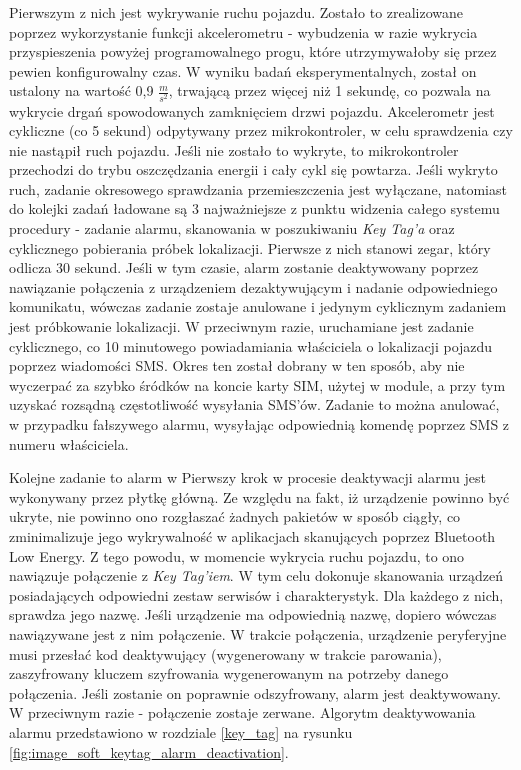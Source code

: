 Pierwszym z nich jest wykrywanie ruchu pojazdu. Zostało to zrealizowane poprzez wykorzystanie funkcji akcelerometru - wybudzenia w razie wykrycia przyspieszenia powyżej programowalnego progu, które utrzymywałoby się przez pewien konfigurowalny czas. W wyniku badań eksperymentalnych, został on ustalony na wartość 0,9 $\frac{m}{s^2}$, trwającą przez więcej niż 1 sekundę, co pozwala na wykrycie drgań spowodowanych zamknięciem drzwi pojazdu. Akcelerometr jest cykliczne (co 5 sekund) odpytywany przez mikrokontroler, w celu sprawdzenia czy nie nastąpił ruch pojazdu. Jeśli nie zostało to wykryte, to mikrokontroler przechodzi do trybu oszczędzania energii i cały cykl się powtarza. Jeśli wykryto ruch, zadanie okresowego sprawdzania przemieszczenia jest wyłączane, natomiast do kolejki zadań ładowane są 3 najważniejsze z punktu widzenia całego systemu procedury - zadanie alarmu, skanowania w poszukiwaniu \textit{Key Tag'a} oraz cyklicznego pobierania próbek lokalizacji. Pierwsze z nich stanowi zegar, który odlicza 30 sekund. Jeśli w tym czasie, alarm zostanie deaktywowany poprzez nawiązanie połączenia z urządzeniem dezaktywującym i nadanie odpowiedniego komunikatu, wówczas zadanie zostaje anulowane i jedynym cyklicznym zadaniem jest próbkowanie lokalizacji. W przeciwnym razie, uruchamiane jest zadanie cyklicznego, co 10 minutowego powiadamiania właściciela o lokalizacji pojazdu poprzez wiadomości SMS. Okres ten został dobrany w ten sposób, aby nie wyczerpać za szybko śródków na koncie karty SIM, użytej w module, a przy tym uzyskać rozsądną częstotliwość wysyłania SMS'ów. Zadanie to można anulować, w przypadku fałszywego alarmu, wysyłając odpowiednią komendę poprzez SMS z numeru właściciela. 

Kolejne zadanie to alarm w Pierwszy krok w procesie deaktywacji alarmu jest wykonywany przez płytkę główną. Ze względu na fakt, iż urządzenie powinno być ukryte, nie powinno ono rozgłaszać żadnych pakietów w sposób ciągły, co zminimalizuje jego wykrywalność w aplikacjach skanujących poprzez Bluetooth Low Energy. Z tego powodu, w momencie wykrycia ruchu pojazdu, to ono nawiązuje połączenie z \textit{Key Tag'iem}. W tym celu dokonuje skanowania urządzeń posiadających odpowiedni zestaw serwisów i charakterystyk. Dla każdego z nich, sprawdza jego nazwę. Jeśli urządzenie ma odpowiednią nazwę, dopiero wówczas nawiązywane jest z nim połączenie. W trakcie połączenia, urządzenie peryferyjne musi przesłać kod deaktywujący (wygenerowany w trakcie parowania), zaszyfrowany kluczem szyfrowania wygenerowanym na potrzeby danego połączenia. Jeśli zostanie on poprawnie odszyfrowany, alarm jest deaktywowany. W przeciwnym razie - połączenie zostaje zerwane. Algorytm deaktywowania alarmu przedstawiono w rozdziale \ref{key_tag} na rysunku \ref{fig:image_soft_keytag_alarm_deactivation}.

